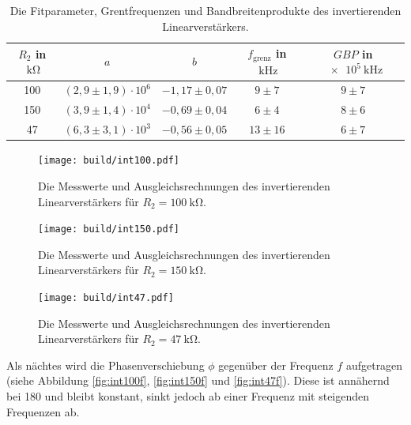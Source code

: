\begin{table}
    \centering
    \begin{tabular}{c c c c c}
        \toprule
        $R_2$ in $\qty{}{\kilo\ohm}$ & $a$  & $b$  & $f_\text{grenz}$ in $\qty{}{\kilo \hertz}$ & $GBP$ in $\qty{e5}{\kilo \hertz}$  \\
        \midrule   
        100 &    $(2,9 \pm 1,9)\cdot 10^{6}$ & $-1,17 \pm 0,07$ & $9 \pm 7  $ & $9 \pm 7$ \\
        150 &    $(3,9 \pm 1,4)\cdot 10^{4}$ & $-0,69 \pm 0,04$ & $6 \pm 4  $ & $8 \pm 6$ \\
        47  &    $(6,3 \pm 3,1)\cdot 10^{3}$ & $-0,56 \pm 0,05$ & $13 \pm 16$ & $6 \pm 7$ \\
        \bottomrule   
    \end{tabular}
    \caption{Die Fitparameter, Grentfrequenzen und Bandbreitenprodukte des invertierenden Linearverstärkers.}
    \label{tab:int_fit}
\end{table}

\begin{figure}
    \centering
    \texttt{[image: build/int100.pdf]}
    \caption{Die Messwerte und Ausgleichsrechnungen 
    des invertierenden Linearverstärkers für $R_2=\qty{100}{\kilo\ohm}$.}
    \label{fig:int100}
\end{figure}
\begin{figure}
    \centering
    \texttt{[image: build/int150.pdf]}
    \caption{Die Messwerte und Ausgleichsrechnungen 
    des invertierenden Linearverstärkers für $R_2=\qty{150}{\kilo\ohm}$.}
    \label{fig:int150}
\end{figure}
\begin{figure}
    \centering
    \texttt{[image: build/int47.pdf]}
    \caption{Die Messwerte und Ausgleichsrechnungen 
    des invertierenden Linearverstärkers für $R_2=\qty{47}{\kilo\ohm}$.}
    \label{fig:int47}
\end{figure}
\FloatBarrier
Als nächtes wird die Phasenverschiebung $\phi$ gegenüber der Frequenz $f$ aufgetragen 
(siehe Abbildung \ref{fig:int100f}, \ref{fig:int150f} und \ref{fig:int47f}). 
Diese ist annähernd bei 180 und bleibt konstant, 
sinkt jedoch ab einer Frequenz mit steigenden Frequenzen ab.

